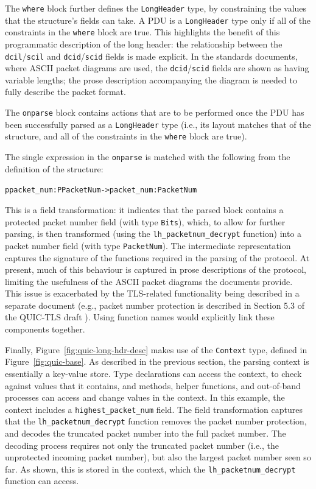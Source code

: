 \documentclass[10pt,sigconf]{acmart}
\begin{document}
The \texttt{where} block further defines the \texttt{LongHeader} type, by constraining the
values that the structure's fields can take. A PDU is a \texttt{LongHeader} type only if
all of the constraints in the \texttt{where} block are true. This highlights the benefit
of this programmatic description of the long header: the relationship
between the \texttt{dcil}/\texttt{scil} and \texttt{dcid}/\texttt{scid} fields is made
explicit. In the standards documents, where ASCII packet diagrams are used, the
\texttt{dcid}/\texttt{scid} fields are shown as having variable lengths; the prose
description accompanying the diagram is needed to fully describe the packet format.

The \texttt{onparse} block contains actions that are to be performed once the PDU has been
successfully parsed as a \texttt{LongHeader} type (i.e., its layout matches that of
the structure, and all of the constraints in the \texttt{where} block are true).

The single expression in the \texttt{onparse} is matched with the following from the
definition of the structure:
\footnotesize
\begin{alltt}
    ppacket_num : PPacketNum -> packet_num : PacketNum
\end{alltt}
\normalsize
This is a field transformation: it indicates that the parsed block
contains a protected packet number field (with type \texttt{Bits}), which, to allow
for further parsing, is then transformed (using the \texttt{lh\_packetnum\_decrypt} function)
into a packet number field (with type \texttt{PacketNum}). The intermediate
representation captures the signature of the functions required in the parsing of the
protocol. At present, much of this behaviour is captured in prose descriptions of the
protocol, limiting the usefulness of the ASCII packet diagrams the documents provide.
This issue is exacerbated by the TLS-related functionality being described in a separate
document (e.g., packet number protection is described in Section 5.3 of the
QUIC-TLS draft \cite{draft-ietf-quic-tls-14}). Using function names would
explicitly link these components together. 

Finally, Figure~\ref{fig:quic-long-hdr-desc} makes use of the \texttt{Context} type,
defined in Figure~\ref{fig:quic-base}. As
described in the previous section, the parsing context is essentially a key-value store. Type
declarations can access the context, to check against values that it contains, and methods,
helper functions, and out-of-band processes can access and change values in the context. In
this example, the context includes a \texttt{highest\_packet\_num} field. The field
transformation captures that the
\texttt{lh\_packetnum\_decrypt} function removes the packet
number protection, and decodes the truncated packet number into the full packet number.
The decoding process requires not only the truncated packet number (i.e., the unprotected
incoming packet number), but also the largest packet number seen so far. As shown, this is
stored in the context, which the \texttt{lh\_packetnum\_decrypt} function can access.
\end{document}

